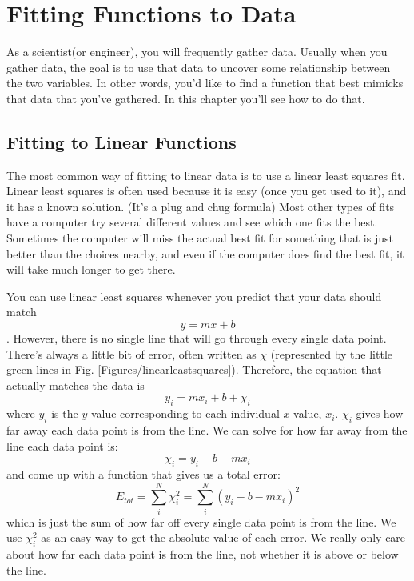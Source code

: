 \chapter{Fitting Functions to Data}
\label{chap:Fitting}

As a scientist(or engineer), you will frequently gather data.  Usually
when you gather data, the goal is to use that data to uncover some
relationship between the two variables.  In other words, you'd like to
find a function that best mimicks that data that you've gathered.  In
this chapter you'll see how to do that.

\section{Fitting to Linear Functions}
The most common way of fitting to linear data is to use a linear least squares fit.  Linear least squares is often used because it is easy (once you get used to it),  and it has a known solution. (It's a plug and chug formula)
Most other types of fits have a computer try several different values and see which one fits the best.  Sometimes the computer will miss the actual best fit for something that is just better than the choices nearby, and even if the computer does find the best fit, it will take much longer to get there.


You can use linear least squares whenever you predict that your data should match \[y=mx+b\]. However, there is no single line that will go through every single data point.  There's always a little bit of error, often written as $\chi$ (represented by the little green lines in Fig. \ref{Figures/linearleastsquares}).  Therefore, the equation that  actually matches the data is \[y_i=mx_i+b+\chi_i\]
where $y_i$ is the $y$ value corresponding to each individual $x$ value, $x_i$.  $\chi_i$ gives how far away each data point is from the line. We can solve for how far away from the line each data point is:
\[\chi_i=y_i-b-mx_i\]
and come up with a function that gives us a total error:
\[E_{tot}=\sum_i^N \chi_i^2 = \sum_i^N (y_i-b-mx_i)^2\]
which is just the sum of how far off every single data point is from the line.  We use $\chi_i^2$ as an easy way to get the absolute value of each error.  We really only care about how far each data point is from the line, not whether it is above or below the line.

